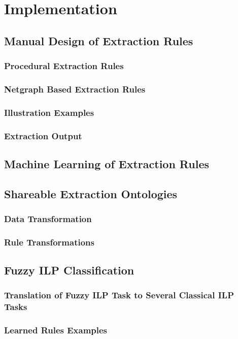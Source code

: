 \chapter{Implementation} \label{sec:ch_implementation}

\section{Manual Design of Extraction Rules} \label{sec:impl_manual_rules}

\subsection{Procedural Extraction Rules} \label{sec:impl_btred_rules}

\subsection{Netgraph Based Extraction Rules}

\subsection{Illustration Examples}

\subsection{Extraction Output} \label{sec:impl_manual_output}

\section{Machine Learning of Extraction Rules}

\section{Shareable Extraction Ontologies}

\subsection{Data Transformation}

\subsection{Rule Transformations}

\section{Fuzzy ILP Classification}

\subsection{Translation of Fuzzy ILP Task to Several Classical ILP Tasks}

\subsection{Learned Rules Examples}
